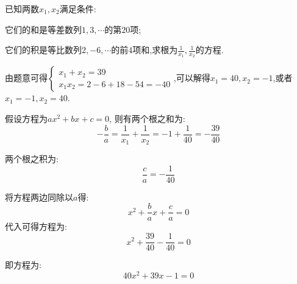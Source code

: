 \begin{questions}
	\question 已知两数$x_1, x_2$满足条件:
	\begin{penum}
		\item 它们的和是等差数列$1,3,\cdots$的第$20$项;
		\item 它们的积是等比数列$2,-6,\cdots$的前$4$项和,求根为$\frac{1}{x_1}, \frac{1}{x_2}$的方程.
	\end{penum}

	\begin{solution}
		由题意可得\begin{math}
			\begin{cases}
				x_1 + x_2 = 39 \\
				x_1x_2 = 2 -6 + 18 - 54 = -40
			\end{cases}
		\end{math},可以解得$x_1=40, x_2 = -1$,或者$x_1=-1, x_2 = 40$.

		假设方程为$ax^2 + bx + c = 0$, 则有两个根之和为:
		\begin{displaymath}
			-\frac{b}{a} = \frac1{x_1} + \frac1{x_2} = -1 + \frac1{40} = -\frac{39}{40}
		\end{displaymath}

		两个根之积为:
		\begin{displaymath}
			\frac{c}{a} = -\frac{1}{40}
		\end{displaymath}

		将方程两边同除以$a$得:
		\begin{displaymath}
			x^2 + \frac{b}{a}x + \frac{c}{a} = 0
		\end{displaymath}
		代入可得方程为:
		\begin{displaymath}
			x^2 + \frac{39}{40} -\frac{1}{40} = 0
		\end{displaymath}

		即方程为:
		\begin{displaymath}
			40x^2 + 39x - 1=0
		\end{displaymath}

	\end{solution}
\end{questions}
